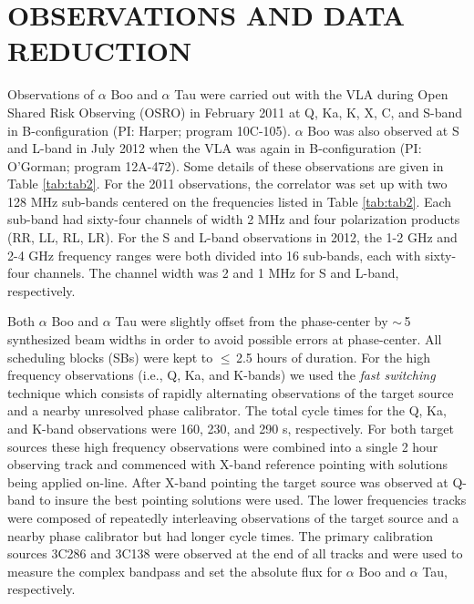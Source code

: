 \documentclass[iop]{emulateapj}
\begin{document}
\section{OBSERVATIONS AND DATA REDUCTION}

Observations of $\alpha$ Boo and $\alpha$ Tau were carried out with the VLA during Open Shared Risk Observing (OSRO) in February 2011 at Q, Ka, K, X, C, and S-band in B-configuration (PI: Harper; program 10C-105). $\alpha$ Boo was also observed at S and L-band in July 2012 when the VLA was again in B-configuration (PI: O'Gorman; program 12A-472). Some details of these observations are given in Table \ref{tab:tab2}. For the 2011 observations, the correlator was set up with two 128 MHz sub-bands centered on the frequencies listed in Table \ref{tab:tab2}. Each sub-band had sixty-four channels of width 2 MHz and four polarization products (RR, LL, RL, LR). For the S and L-band observations in 2012, the 1-2 GHz and 2-4 GHz frequency ranges were both divided into 16 sub-bands, each with sixty-four channels. The channel width was 2 and 1 MHz for S and L-band, respectively.

Both $\alpha$ Boo and $\alpha$ Tau were slightly offset from the phase-center by $\sim$\,5 synthesized beam widths in order to avoid possible errors at phase-center. All scheduling blocks (SBs) were kept to $\le$\,2.5 hours of duration. For the high frequency observations (i.e., Q, Ka, and K-bands) we used the \textit{fast switching} technique which consists of rapidly alternating observations of the target source and a nearby unresolved phase calibrator. The total cycle times for the Q, Ka, and K-band observations were 160, 230, and 290 s, respectively. For both target sources these high frequency observations were combined into a single 2 hour observing track and commenced with X-band reference pointing with solutions being applied on-line. After X-band pointing the target source was observed at Q-band to insure the best pointing solutions were used. The lower frequencies tracks were composed of repeatedly interleaving observations of the target source and a nearby phase calibrator but had longer cycle times. The primary calibration sources 3C286 and 3C138 were observed at the end of all tracks and were used to measure the complex bandpass and set the absolute flux for $\alpha$ Boo and $\alpha$ Tau, respectively.  
\end{document}
